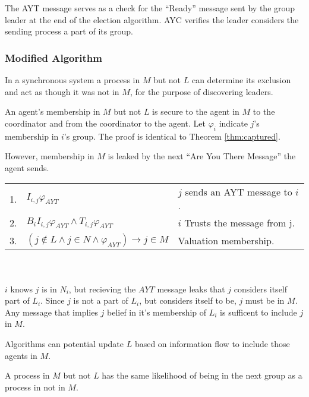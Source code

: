 The \ac{AYT} message serves as a check for the ``Ready'' message sent by the group leader at the end of the election algorithm. \ac{AYC} verifies the leader considers the sending process a part of its group.

\subsubsection{Modified Algorithm}

\begin{thm}
In a synchronous system a process in $M$ but not $L$ can determine its exclusion and act as though it was not in $M$, for the purpose of discovering leaders.
\end{thm}

An agent's membership in $M$ but not $L$ is secure to the agent in $M$ to the coordinator and from the coordinator to the agent. Let $\varphi_i$ indicate $j$'s membership in $i$'s group. The proof is identical to Theorem \ref{thm:captured}.

However, membership in $M$ is leaked by the next ``Are You There Message'' the agent sends.

\begin{table}[h!]
\centering
\small
\begin{tabularx}{\linewidth}{l X X}
1. & $I_{i,j} \varphi_{AYT}$ & $j$ sends an AYT message to $i$. \\
2. & $B_i I_{i,j} \varphi_{AYT} \wedge T_{i,j} \varphi_{AYT}$ & $i$ Trusts the message from j. \\
3. & $(j \not \in L \wedge j \in N \wedge \varphi_{AYT}) \rightarrow j \in M $ & Valuation membership. \\ 
\end{tabularx} \\~\\
$i$ knows $j$ is in $N_i$, but recieving the $AYT$ message leaks that $j$ considers itself part of $L_i$. Since $j$ is not a part of $L_i$, but considers itself to be, $j$ must be in $M$. Any message that implies $j$ belief in it's membership of $L_i$ is sufficent to include $j$ in $M$.
\end{table}

Algorithms can potential update $L$ based on information flow to include those agents in $M$.

\begin{thm}
A process in $M$ but not $L$ has the same likelihood of being in the next group as a process in not in $M$.
\end{thm}

